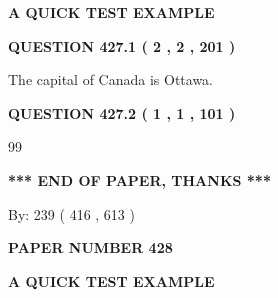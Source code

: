 \documentclass[12pt]{article}
\begin{document}
   
 \vspace{0.2in}
{\LARGE {\textbf{ A QUICK TEST EXAMPLE}}}
   
   
  
\vspace{0.2in}
  
{\textbf{\Large{QUESTION
427.1 
 ( 2 , 2 , 201 )
}}}
  
  
 
 
\noindent{}
 
 
The capital of Canada is Ottawa.
 
 
 
 
  
\vspace{0.2in}
  
{\textbf{\Large{QUESTION
427.2 
 ( 1 , 1 , 101 )
}}}
  
  
 
 
\noindent{}

99
 
 
   
   
 \vspace{0.2in}
 
   
   
   
   
\vspace{1.0in} 
{\textbf{\large{ *** END OF PAPER, THANKS *** }}} 
   
   
\hspace{1.0in} By: 
 239 ( 416 ,  613 )
   
   
   
   
\newpage 
\setcounter{page}{ 
   428001 } 
   
   
   
   
 {\textbf{ \Large{ PAPER NUMBER  428  }}}
   
   
\vspace{0.2in}
   
   
   
   
   
   
 \vspace{0.2in}
{\LARGE {\textbf{ A QUICK TEST EXAMPLE}}}
   
   
  
\vspace{0.2in}
  
\end{document}
